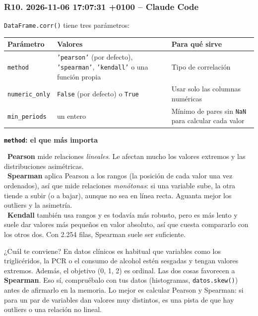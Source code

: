 \documentclass[11pt,a4paper]{article}
\begin{document}
\subsubsection*{R10. 2026-11-06 17:07:31 +0100 -- Claude Code}
{\small
\texttt{DataFrame.corr()} tiene tres parámetros:

{\footnotesize\noindent\begin{tabularx}{\linewidth}{>{\raggedright\arraybackslash}X>{\raggedright\arraybackslash}X>{\raggedright\arraybackslash}X}
\toprule
\textbf{Parámetro} & \textbf{Valores} & \textbf{Para qué sirve} \\
\midrule
\texttt{method} & \texttt{'pearson'} (por defecto), \texttt{'spearman'}, \texttt{'kendall'} o una función propia & Tipo de correlación \\
\texttt{numeric\_\allowbreak{}only} & \texttt{False} (por defecto) o \texttt{True} & Usar solo las columnas numéricas \\
\texttt{min\_\allowbreak{}periods} & un entero & Mínimo de pares sin \texttt{NaN} para calcular cada valor \\
\bottomrule
\end{tabularx}}

\textbf{\texttt{method}: el que más importa}

\hspace*{1.0em}\textbullet~\textbf{Pearson} mide relaciones \textit{lineales}. Le afectan mucho los valores extremos y las distribuciones asimétricas. \\{}
\hspace*{1.0em}\textbullet~\textbf{Spearman} aplica Pearson a los rangos (la posición de cada valor una vez ordenados), así que mide relaciones \textit{monótonas}: si una variable sube, la otra tiende a subir (o a bajar), aunque no sea en línea recta. Aguanta mejor los outliers y la asimetría. \\{}
\hspace*{1.0em}\textbullet~\textbf{Kendall} también usa rangos y es todavía más robusto, pero es más lento y suele dar valores más pequeños en valor absoluto, así que cuesta compararlo con los otros dos. Con 2.254 filas, Spearman suele ser suficiente.

¿Cuál te conviene? En datos clínicos es habitual que variables como los triglicéridos, la PCR o el consumo de alcohol estén sesgadas y tengan valores extremos. Además, el objetivo (0, 1, 2) es ordinal. Las dos cosas favorecen a \textbf{Spearman}. Eso sí, compruébalo con tus datos (histogramas, \texttt{datos.skew()}) antes de afirmarlo en la memoria. Lo mejor es calcular Pearson y Spearman: si para un par de variables dan valores muy distintos, es una pista de que hay outliers o una relación no lineal.

}
\end{document}

